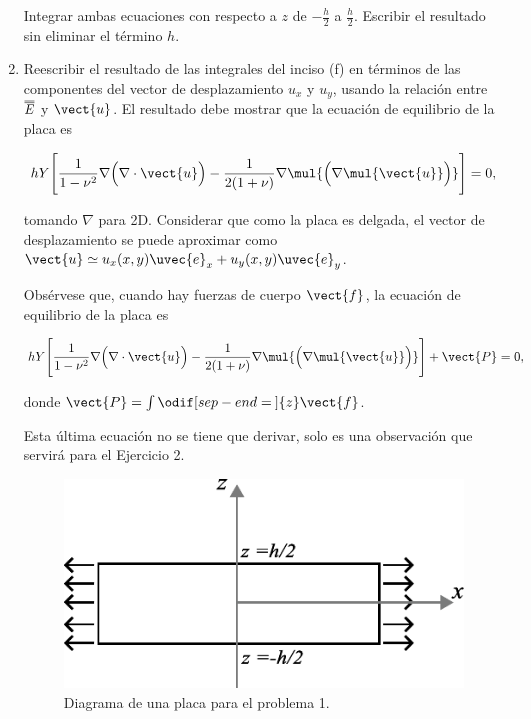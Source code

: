 \documentclass[../main.tex]{subfiles}
\begin{document}
\begin{problema}[4]
\begin{enumerate}
		      Integrar ambas ecuaciones con respecto a \(z\) de \(-\tfrac{h}{2}\) a
		      \(\tfrac{h}{2}\). Escribir el resultado sin eliminar
		      el término \(h\).
		\item Reescribir el resultado de las integrales del inciso (f) en
		      términos de las componentes del vector de desplazamiento \(u_{x}\) y
		      \(u_{y}\), usando la relación entre \(\dbloverline{E}\) y \(\vect{u}\).
		      El resultado debe mostrar que la ecuación de equilibrio de la
		      placa es

		      \begin{equation*}
			      hY \Biggl[\dfrac{1}{1 - \nu^{2}}\nabla{\Bigl(\nabla \cdot{\vect{u}}\Bigr)} - \dfrac{1}{2(1 + \nu)}\nabla \mul{\Bigl(\nabla \mul{\vect{u}}\Bigr)}\Biggr] = 0,
		      \end{equation*}

		      tomando \(\nabla\) para 2D. Considerar que como la placa es
		      delgada, el vector de desplazamiento se puede aproximar como
		      \(\vect{u} \simeq u_{x}(x,y) \uvec{e}_{x} + u_{y}(x, y)\uvec{e}_{y}\).

		      Obsérvese que, cuando hay fuerzas de cuerpo \(\vect{f}\), la ecuación
		      de equilibrio de la placa es

		      \begin{equation*}
			      hY \Biggl[\dfrac{1}{1 - \nu^{2}}\nabla{\Bigl(\nabla \cdot{\vect{u}}\Bigr)} - \dfrac{1}{2(1 + \nu)}\nabla \mul{\Bigl(\nabla \mul{\vect{u}}\Bigr)}\Biggr] + \vect{P} = 0,
		      \end{equation*}

		      donde \(\vect{P} = \int \odif[sep-end=\medspace]{z} \vect{f}\).

		      Esta última ecuación no se tiene que derivar, solo es una observación
		      que servirá para el Ejercicio 2.

		      \begin{figure}[htb]
			      \centering
			      \includegraphics{figs/problema01.pdf}
			      \caption{Diagrama de una placa para el problema 1.}
			      \label{fig:placa-p1}
		      \end{figure}
	\end{enumerate}
\end{problema}
\end{document}
